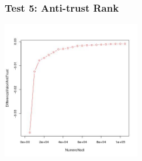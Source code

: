 \documentclass{beamer}
\begin{document}
\begin{frame}
\frametitle{Test 5: Anti-trust Rank}
\begin{center}
 \includegraphics[height=6cm]{immagini/test5/averageTest_antitrust_62}
\end{center}
\end{frame}
\end{document}

